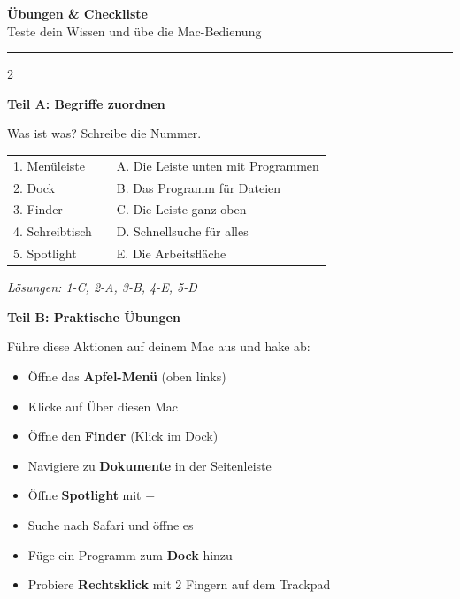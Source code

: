 \documentclass[a4paper,landscape,8pt]{extarticle}
\newcommand{\taste}[1]{\fbox{\small\texttt{#1}}}
\begin{document}
\begin{center}
{\LARGE\bfseries Übungen \& Checkliste}\\[3pt]
{\normalsize Teste dein Wissen und übe die Mac-Bedienung}
\end{center}

\vspace{1mm}
\hrule
\vspace{2mm}

\begin{multicols}{2}

\textbf{\large Teil A: Begriffe zuordnen}

Was ist was? Schreibe die Nummer.

\vspace{2mm}

\renewcommand{\arraystretch}{1.5}
\begin{tabular}{@{}p{4.5cm}p{0.8cm}p{5cm}@{}}
1. Menüleiste & & A. Die Leiste unten mit Programmen \\
2. Dock & & B. Das Programm für Dateien \\
3. Finder & & C. Die Leiste ganz oben \\
4. Schreibtisch & & D. Schnellsuche für alles \\
5. Spotlight & & E. Die Arbeitsfläche \\
\end{tabular}
\renewcommand{\arraystretch}{1}

\textit{\footnotesize Lösungen: 1-C, 2-A, 3-B, 4-E, 5-D}

\vspace{4mm}

\textbf{\large Teil B: Praktische Übungen}

Führe diese Aktionen auf deinem Mac aus und hake ab:

\vspace{2mm}

\begin{itemize}[label=$\square$, itemsep=3pt]
\item Öffne das \textbf{Apfel-Menü} (oben links)
\item Klicke auf \glqq Über diesen Mac\grqq{}
\item Öffne den \textbf{Finder} (Klick im Dock)
\item Navigiere zu \textbf{Dokumente} in der Seitenleiste
\item Öffne \textbf{Spotlight} mit \taste{cmd} + \taste{Leertaste}
\item Suche nach \glqq Safari\grqq{} und öffne es
\item Füge ein Programm zum \textbf{Dock} hinzu
\item Probiere \textbf{Rechtsklick} mit 2 Fingern auf dem Trackpad
\end{itemize}


\end{multicols}
\end{document}
